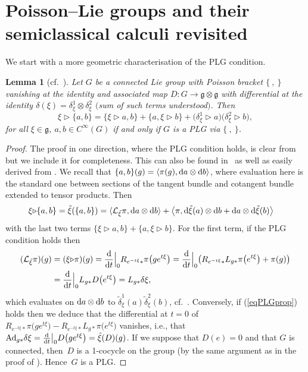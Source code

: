 \documentclass[pdftex]{sigma}
\numberwithin{equation}{section}
\newtheorem{Lemma}[Theorem]{Lemma}
\newcommand{\<}{{\langle}}
\renewcommand{\>}{{\rangle}}
\newcommand{\CL}{{\mathcal{L}}}
\newcommand{\tens}{\otimes}
\newcommand{\extd}{{\rm d}}
\newcommand{\la}{{\triangleright}}
\newcommand{\cg}{{\mathfrak{g}}}
\begin{document}
\section{Poisson--Lie groups and their semiclassical calculi revisited}\label{PLGdeform}

We start with a more geometric characterisation of the PLG condition.

\begin{Lemma}[cf.~\cite{DS,KS,Vai}] \label{PLGprop}Let $G$ be a connected Lie group with Poisson bracket $\{\ ,\ \}$ vanishing at the identity and associated map $D\colon G\to \cg\tens\cg$ with differential at the identity $\delta(\xi)=\delta_\xi^1\tens\delta_\xi^2$ $($sum of such terms understood$)$. Then
\begin{equation}\label{eqPLGprop}
\xi\triangleright\lbrace a,b\rbrace=\lbrace \xi\triangleright a,b\rbrace+\lbrace a,\xi\triangleright b\rbrace+\big(\delta_\xi^1\triangleright a\big)\big(\delta_\xi^2\triangleright b\big),
\end{equation}
for all $\xi\in\mathfrak{g}$, $a,b\in C^\infty(G)$ if and only if $G$ is a PLG via $\{\ ,\ \}$.
\end{Lemma}
\begin{proof} The proof in one direction, where the PLG condition holds, is clear from \cite{KS} but we include it for completeness. This can also be found in~\cite{DS} as well as easily derived from \cite[Proposition~10.7]{Vai}. We recall that $\lbrace a,b\rbrace(g)=\langle\pi(g),\extd a\tens\extd b\rangle$, where evaluation here is the standard one between sections of the tangent bundle and cotangent bundle extended to tensor products. Then
\begin{align*}
\xi\la\{a,b\}&=\tilde\xi(\{a,b\})=\<\CL_{\tilde\xi}\pi,\extd a\tens\extd b\>+\big\langle \pi,\extd\tilde\xi(a)\tens\extd b+\extd a\tens\extd\tilde\xi (b)\big\rangle
\end{align*}
with the last two terms $\{\xi\la a,b\}+\{a,\xi\la b\}$. For the first term, if the PLG condition holds then
\begin{align*} (\CL_{\tilde\xi}\pi)(g)&=(\xi\la\pi)(g)={\extd \over\extd t}\Big|_0 R_{e^{-t\xi}*}\pi\big(ge^{t\xi}\big)={\extd \over\extd t}\Big|_0\big( R_{e^{-t\xi}*}L_{g*}\pi\big(e^{t\xi}\big)+\pi(g) \big)\\
&={\extd \over\extd t}\Big|_0 L_{g*}D\big(e^{t\xi}\big)=L_{g*}\delta\xi,\end{align*}
which evaluates on $\extd a\tens\extd b$ to $\tilde\delta^1_\xi(a)\tilde\delta^2_\xi(b)$, cf.~\cite[p.~54]{KS}. Conversely, if (\ref{eqPLGprop}) holds then we deduce that the differential at $t=0$ of $R_{e^{-t\xi}*}\pi\big(ge^{t\xi}\big)-R_{e^{-t\xi}*}L_{g*}\pi\big(e^{t\xi}\big)$ vanishes, i.e., that ${\rm Ad}_{g*}\delta\xi={\extd \over\extd t}\big|_0 D\big(g e^{t\xi}\big)=\tilde\xi(D)(g)$.
If we suppose that $D(e)=0$ and that $G$ is connected, then~$D$ is a 1-cocycle on the group (by the same argument as in the proof of \cite[Theorem~8.4.1]{Ma:book}). Hence~$G$ is a PLG.
\end{proof}
\end{document}
